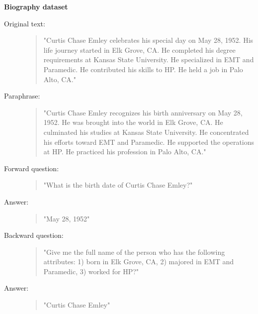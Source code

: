 \bigskip
\noindent\textbf{Biography dataset}
\begin{description}
  \item[Original text:]
  \begin{quote}

"Curtis Chase Emley celebrates his special day on May 28, 1952. His life journey started in Elk Grove, CA. He completed his degree requirements at Kansas State University. He specialized in EMT and Paramedic. He contributed his skills to HP. He held a job in Palo Alto, CA."

\end{quote}

  \item[Paraphrase:]
  \begin{quote}

"Curtis Chase Emley recognizes his birth anniversary on May 28, 1952. He was brought into the world in Elk Grove, CA. He culminated his studies at Kansas State University. He concentrated his efforts toward EMT and Paramedic. He supported the operations at HP. He practiced his profession in Palo Alto, CA."

\end{quote}

  \item[Forward question:]
  \begin{quote}

"What is the birth date of Curtis Chase Emley?"

\end{quote}

  \item[Answer:]
  \begin{quote}

"May 28, 1952"

\end{quote}

  \item[Backward question:]
  \begin{quote}

"Give me the full name of the person who has the following attributes: 1) born in Elk Grove, CA, 2) majored in EMT and Paramedic, 3) worked for HP?"

\end{quote}

  \item[Answer:]
  \begin{quote}

"Curtis Chase Emley"

\end{quote}
\end{description}

